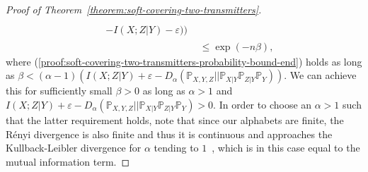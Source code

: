 \documentclass[journal]{IEEEtran}
\newcommand{\channelInOne}{X}
\newcommand{\channelInTwo}{Y}
\newcommand{\channelOut}{Z}
\newcommand{\codebookBlocklength}{n}
\newcommand{\mutualInformationConditional}[3]{I(#1;#2|#3)}
\newcommand{\renyiParam}{\alpha}
\newcommand{\proofconstantOne}{{\beta}}
\newcommand{\renyidiv}[3]{D_{#1}\left({#2} || {#3}\right)}
\newcommand{\Probability}{\mathbb{P}}
\newcommand{\typicalityParam}{\varepsilon}
\begin{document}
\begin{proof}[Proof of Theorem~\ref{theorem:soft-covering-two-transmitters}]
\begin{align}
\begin{aligned}
\\
    &-
    \mutualInformationConditional{\channelInOne}{\channelOut}{\channelInTwo}-\typicalityParam 
  )
\big)
\end{aligned}
\\
&\leq
\exp(-\codebookBlocklength\proofconstantOne),
\label{proof:soft-covering-two-transmitters-probability-bound-end}
\end{align}
where (\ref{proof:soft-covering-two-transmitters-probability-bound-end}) holds as long as $\proofconstantOne < (\renyiParam-1)(\mutualInformationConditional{\channelInOne}{\channelOut}{\channelInTwo}+\typicalityParam-\renyidiv{\renyiParam}{\Probability_{\channelInOne, \channelInTwo, \channelOut}}{\Probability_{\channelInOne | \channelInTwo}\Probability_{\channelOut | \channelInTwo}\Probability_\channelInTwo})$. We can achieve this for sufficiently small $\proofconstantOne > 0$ as long as $\renyiParam>1$ and $\mutualInformationConditional{\channelInOne}{\channelOut}{\channelInTwo}+\typicalityParam-\renyidiv{\renyiParam}{\Probability_{\channelInOne, \channelInTwo, \channelOut}}{\Probability_{\channelInOne | \channelInTwo}\Probability_{\channelOut | \channelInTwo}\Probability_\channelInTwo} > 0$. In order to choose an $\renyiParam > 1$ such that the latter requirement holds, note that since our alphabets are finite, the Rényi divergence is also finite and thus it is continuous and approaches the Kullback-Leibler divergence for $\renyiParam$ tending to $1$~\cite{RenyiDiv}, which is in this case equal to the mutual information term.


\end{proof}
\end{document}
